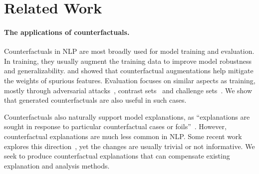 \section{Related Work}
\label{sec:relate}

\paragraph{The applications of counterfactuals.}
Counterfactuals in NLP are most broadly used for model training and evaluation.
In training, they usually augment the training data to improve model robustness~\cite{garg2019counterfactual, Wu2019ConditionalBC, Wei2019EDAED, Kumar2020DataAU} and generalizability.
\citet{kaushik2019learning} and \citet{teney2020learning} showed that counterfactual augmentations help mitigate the weights of spurious features.
Evaluation focuses on similar aspects as training, mostly through adversarial attacks~\cite{Song2020UniversalAA}, contrast sets~\cite{kaushik2019learning} and challenge sets~\cite{Geiger2019PosingFG, liu-etal-2019-inoculation}.
We show that \sysname generated counterfactuals are also useful in such cases.

Counterfactuals also naturally support model explanations, as ``explanations are sought in response to particular counterfactual cases or foils''~\cite{miller}.
However, counterfactual explanations are much less common in NLP.
Some recent work explores this direction~\cite{ross2020explaining, vig2020causal, kang2020counterfactual}, yet the changes are usually trivial or not informative.
We seek to produce counterfactual explanations that can compensate existing explanation and analysis methods.

